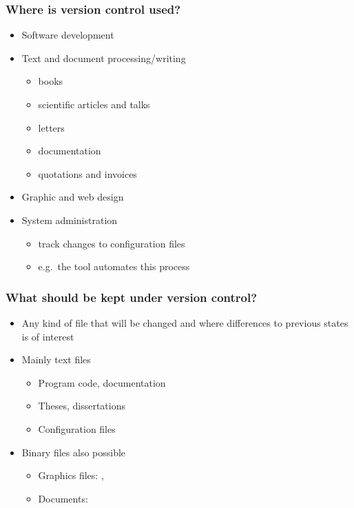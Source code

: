 \begin{frame}
\frametitle{Where is version control used?}
    \begin{itemize}
    \item Software development
    \item Text and document processing/writing
        \begin{itemize}
            \item books
            \item scientific articles and talks
            \item letters
            \item documentation
            \item quotations and invoices
        \end{itemize}
    \item Graphic and web design
    \item System administration
        \begin{itemize}
            \item track changes to configuration files
            \item e.g.\ the tool  automates this process
        \end{itemize}
    \end{itemize}
\end{frame}

\begin{frame}
\frametitle{What should be kept under version control?}
\begin{itemize}
    \item Any kind of file that will be changed and where differences to
        previous states is of interest
    \item Mainly text files
        \begin{itemize}
        \item Program code, documentation
        \item Theses, dissertations
        \item Configuration files
        \end{itemize}
    \item Binary files also possible
        \begin{itemize}
        \item Graphics files: , 
        \item Documents: 
        \end{itemize}
\end{itemize}
\end{frame}


